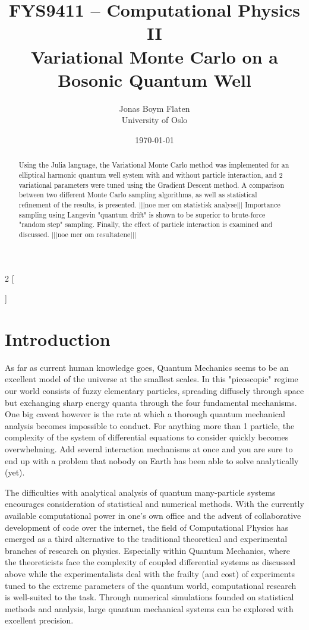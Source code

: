 \documentclass[a4paper,8pt]{article}
\title{\small FYS9411 – Computational Physics II \\
\huge Variational Monte Carlo on a Bosonic Quantum Well}
\author{\large Jonas Boym Flaten \\
\small University of Oslo}
\date{\today}
\begin{document}
\begin{multicols}{2}
[
\maketitle
\begin{abstract}
Using the Julia language, the Variational Monte Carlo method was implemented for an elliptical harmonic quantum well system with and without particle interaction, and 2 variational parameters were tuned using the Gradient Descent method. A comparison between two different Monte Carlo sampling algorithms, as well as statistical refinement of the results, is presented. |||noe mer om statistisk analyse||| Importance sampling using Langevin "quantum drift" is shown to be superior to brute-force "random step" sampling. Finally, the effect of particle interaction is examined and discussed. |||noe mer om resultatene||| 
\end{abstract}
]

\section{Introduction}

As far as current human knowledge goes, Quantum Mechanics seems to be an excellent model of the universe at the smallest scales. In this "picoscopic" regime our world consists of fuzzy elementary particles, spreading diffusely through space but exchanging sharp energy quanta through the four fundamental mechanisms. One big caveat however is the rate at which a thorough quantum mechanical analysis becomes impossible to conduct. For anything more than 1 particle, the complexity of the system of differential equations to consider quickly becomes overwhelming. Add several interaction mechanisms at once and you are sure to end up with a problem that nobody on Earth has been able to solve analytically (yet).

The difficulties with analytical analysis of quantum many-particle systems encourages consideration of statistical and numerical methods. With the 
currently available computational power in one's own office and the advent of collaborative development of code over the internet, the field of Computational Physics has emerged as a third alternative to the traditional theoretical and experimental branches of research on physics. Especially within Quantum Mechanics, where the theoreticists face the complexity of coupled differential systems as discussed above while the experimentalists deal with the frailty (and cost) of experiments tuned to the extreme parameters of the quantum world, computational research is well-suited to the task. Through numerical simulations founded on statistical methods and analysis, large quantum mechanical systems can be explored with excellent precision.


\end{multicols}
\end{document}
